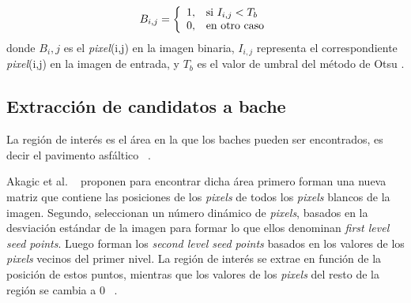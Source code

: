 $$B_{i,j}=\left\{
    \begin{array}{c l}
        1, & \text{si } I_{i,j} < T_{b}\\
        0, & \text{en otro caso}\\
    \end{array}
\right.$$
donde $B_i,j$ es el \emph{pixel}(i,j) en la imagen binaria, $I_{i,j}$ representa el correspondiente \emph{pixel}(i,j) en la imagen de entrada, y
$T_b$ es el valor de umbral del método de Otsu .

\subsection{Extracción de candidatos a bache}
La región de interés es el área en la que los baches pueden ser encontrados, es decir el pavimento asfáltico ~.

Akagic et al. ~ proponen para encontrar dicha área  primero forman una nueva matriz que contiene las posiciones 
de los \emph{pixels} de todos los \emph{pixels} blancos de la imagen. Segundo, seleccionan un número dinámico de \emph{pixels}, basados 
en la desviación estándar de la imagen para formar lo que ellos denominan \emph{first level seed points}. Luego forman  los 
\emph{second level seed points} basados en los valores de los \emph{pixels} vecinos del primer nivel. La región de
interés se extrae en función de la posición de estos puntos, mientras que los valores de los \emph{pixels} del resto de la región se cambia a
0 ~.

